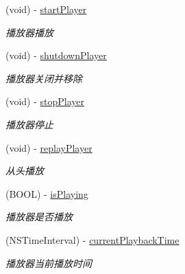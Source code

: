 \begin{DoxyCompactItemize}
(void) -\/ \hyperlink{interface_offline_play_back_a96d5cf73bdffcd575a2e5100547e6e91}{start\+Player}
\begin{DoxyCompactList}\small\item\em 播放器播放 \end{DoxyCompactList}\item 
\mbox{\label{interface_offline_play_back_ae9a74cc8b04aec15c364fb2a61a2fee9}} 
(void) -\/ \hyperlink{interface_offline_play_back_ae9a74cc8b04aec15c364fb2a61a2fee9}{shutdown\+Player}
\begin{DoxyCompactList}\small\item\em 播放器关闭并移除 \end{DoxyCompactList}\item 
\mbox{\label{interface_offline_play_back_a7dde7a57cc513fb9ebb3e5e635e0eb9a}} 
(void) -\/ \hyperlink{interface_offline_play_back_a7dde7a57cc513fb9ebb3e5e635e0eb9a}{stop\+Player}
\begin{DoxyCompactList}\small\item\em 播放器停止 \end{DoxyCompactList}\item 
\mbox{\label{interface_offline_play_back_a048137f526fa9e1305441ebac3833cd7}} 
(void) -\/ \hyperlink{interface_offline_play_back_a048137f526fa9e1305441ebac3833cd7}{replay\+Player}
\begin{DoxyCompactList}\small\item\em 从头播放 \end{DoxyCompactList}\item 
\mbox{\label{interface_offline_play_back_a86f033aa94f7532be970bea92076af31}} 
(B\+O\+OL) -\/ \hyperlink{interface_offline_play_back_a86f033aa94f7532be970bea92076af31}{is\+Playing}
\begin{DoxyCompactList}\small\item\em 播放器是否播放 \end{DoxyCompactList}\item 
\mbox{\label{interface_offline_play_back_ab19a16ddbca9ee34085ce5250aaf02ee}} 
(N\+S\+Time\+Interval) -\/ \hyperlink{interface_offline_play_back_ab19a16ddbca9ee34085ce5250aaf02ee}{current\+Playback\+Time}
\begin{DoxyCompactList}\small\item\em 播放器当前播放时间 \end{DoxyCompactList}\item 

\end{DoxyCompactItemize}
